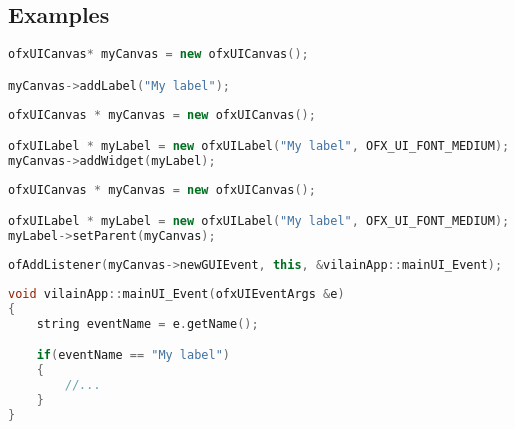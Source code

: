 \documentclass[a4paper,titlepage,oneside]{article}
\begin{document}
	\subsection*{Examples}
		\begin{lstlisting}[language=C++, caption={\texttt{ofxUIWidget} first way implementation}, label={lst:widgetExample_1}]
ofxUICanvas* myCanvas = new ofxUICanvas();

myCanvas->addLabel("My label");

		\end{lstlisting}
			
		\begin{lstlisting}[language=C++, caption={\texttt{ofxUIWidget} second way implementation}, label={lst:widgetExample_2}]
ofxUICanvas * myCanvas = new ofxUICanvas();

ofxUILabel * myLabel = new ofxUILabel("My label", OFX_UI_FONT_MEDIUM);
myCanvas->addWidget(myLabel);
		\end{lstlisting}
		
		\begin{lstlisting}[language=C++, caption={\texttt{ofxUIWidget} third way implementation}, label={lst:widgetExample_3}]
ofxUICanvas * myCanvas = new ofxUICanvas();

ofxUILabel * myLabel = new ofxUILabel("My label", OFX_UI_FONT_MEDIUM);
myLabel->setParent(myCanvas);
		\end{lstlisting}
		
		\begin{lstlisting}[language=C++, caption={\texttt{ofxUI} event listener}, label={lst:eventListener}]
ofAddListener(myCanvas->newGUIEvent, this, &vilainApp::mainUI_Event);
		\end{lstlisting}
		
		\begin{lstlisting}[language=C++, caption={\texttt{ofxUI} event listener}, label={lst:eventManagement}]
void vilainApp::mainUI_Event(ofxUIEventArgs &e)
{
    string eventName = e.getName();

    if(eventName == "My label")
    {
        //...
    }
}
		\end{lstlisting}


\printbibheading
\printbibliography[nottype=online,check=notonline,heading=subbibliography,title={Bibliography}]
\printbibliography[check=online,heading=subbibliography,title={Webography}]
\nocite{openframeworks,ofxUI,REZAALI,OF_TUTORIALS_ofauckland}
\end{document}
